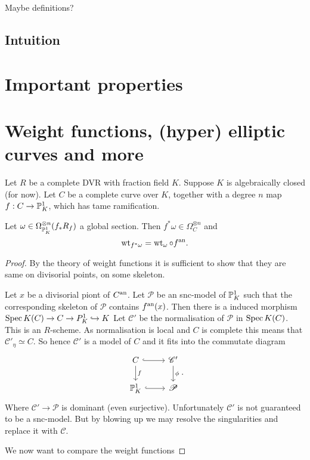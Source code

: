 Maybe definitions?

\subsection{Intuition} \label{sec:intuition}


\section{Important properties} \label{sec:important_properties}


\section{Weight functions, (hyper) elliptic curves and more} \label{sec:weight_functions,_(hyper)_elliptic_curves_and_more}

Let $R$ be a complete DVR with fraction field $K$. 
Suppose $K$ is algebraically closed (for now). 
Let $C$ be a complete curve over $K$, together with a degree $n$ map $f: C\to \mathbb{P}^{1}_K$, which has tame ramification. 
\begin{proposition}
Let $\omega \in \Omega _{\mathbb{P}^{1}_K}^{\otimes n}(f_* R_f)$ a global section. 
Then  $f^* \omega \in \Omega^{\otimes n}_{C}$ and \[
\operatorname{wt}_{f^* \omega} = \operatorname{wt}_{\omega} \circ f^{\text{an}}
.\] 
\end{proposition}

\begin{proof}
	By the theory of weight functions it is sufficient to show that they are same on divisorial points, on some skeleton. 

	Let $x$ be a divisorial piont of $C{}^{\text{an}}$.
	Let $\mathscr{P} $ be an snc-model of $\mathbb{P}^{1}_K$ such that the corresponding skeleton of $\mathscr P$ contains $f{}^{\text{an}} (x)$. 
	Then there is a induced morphism $\operatorname{Spec} K(C) \to C \to P^{1}_K \hookrightarrow K$
	Let $\mathscr{C}'$ be the normalisation of $\mathcal{P} $ in $\operatorname{Spec} K(C)$. 
	This is an $R$-scheme.
	As normalisation is local and  $C$ is complete this means that $\mathcal{C}' _\eta \simeq C$. 
	So hence $\mathscr{C}' $ is a model of $C$ and it fits into the commutate  diagram \[
	\begin{tikzcd}
		C \rar[hookrightarrow] \dar{f} & \mathscr C '\dar{\phi} \\
		\pro^{1}_K \rar[hookrightarrow] & \mathscr P
	\end{tikzcd}
	.\] 
	Where $\mathscr C' \to \mathscr P$ is dominant (even surjective). 
	Unfortunately  $\mathscr C'$ is not guaranteed to be a snc-model. 
	But by blowing up we may resolve the singularities and replace it with $\mathscr C$. 
	
	We now want to compare the weight functions 


\end{proof}


